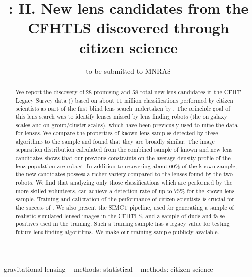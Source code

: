 \documentclass[useAMS,usenatbib,a4paper]{mn2e}
\title[\sw II]
{\SW: II. New lens candidates from the CFHTLS discovered
through citizen science}
\author[More et al.]{%
 
}
\begin{document}
\date{to be submitted to MNRAS}
\pagerange{\pageref{firstpage}--\pageref{lastpage}}

\maketitle

\label{firstpage}


\begin{abstract}

We report the discovery of 28 promising and 58 total new lens candidates
in the CFHT Legacy Survey data (\cfhtls) based on about 11 million
classifications performed by citizen scientists as part of the first
blind lens search undertaken by \sw.  The principle goal of this lens
search was to identify lenses missed by lens finding robots (the \rf on
galaxy scales and \af on group/cluster scales), which have been
previously used to mine the \cfhtls data for lenses.  We compare the
properties of known lens samples detected by these algorithms to the \sw
sample and found that they are broadly similar.  The image separation
distribution calculated from the combined sample of known and new lens
candidates shows that our previous constraints on the average density
profile of the lens population are robust.  In addition to recovering
about 60\% of the known sample, the new \sw candidates possess a richer
variety compared to the lenses found by the two robots. We find that
analyzing only those classifications which are performed by the more
skilled volunteers, \sw can achieve a detection rate of up to 75\% for
the known lens sample.  Training and calibration of the performance of
citizen scientists is crucial for the success of \sw. We also present
the SIMCT pipeline, used for generating a sample of realistic simulated
lensed images in the CFHTLS, and a sample of duds and false positives
used in the training.  Such a training sample has a legacy value for
testing future lens finding algorithms. We make our training sample
publicly available.


\end{abstract}


\begin{keywords}
  gravitational lensing   --
  methods: statistical    --
  methods: citizen science
\end{keywords}
\end{document}
